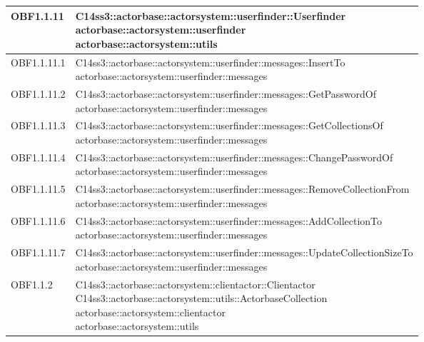 \documentclass{scalatekids-article}
\begin{document}
\begin{longtable}[H]{|p{4.5cm}|p{13cm}|}
\hline
OBF1.1.11 & \multiLineCell[t]{C14ss3::actorbase::actorsystem::userfinder::Userfinder\\actorbase::actorsystem::userfinder\\actorbase::actorsystem::utils\\}\\
\hline
OBF1.1.11.1 & \multiLineCell[t]{C14ss3::actorbase::actorsystem::userfinder::messages::InsertTo\\actorbase::actorsystem::userfinder::messages\\}\\
\hline
OBF1.1.11.2 & \multiLineCell[t]{C14ss3::actorbase::actorsystem::userfinder::messages::GetPasswordOf\\actorbase::actorsystem::userfinder::messages\\}\\
\hline
OBF1.1.11.3 & \multiLineCell[t]{C14ss3::actorbase::actorsystem::userfinder::messages::GetCollectionsOf\\actorbase::actorsystem::userfinder::messages\\}\\
\hline
OBF1.1.11.4 & \multiLineCell[t]{C14ss3::actorbase::actorsystem::userfinder::messages::ChangePasswordOf\\actorbase::actorsystem::userfinder::messages\\}\\
\hline
OBF1.1.11.5 & \multiLineCell[t]{C14ss3::actorbase::actorsystem::userfinder::messages::RemoveCollectionFrom\\actorbase::actorsystem::userfinder::messages\\}\\
\hline
OBF1.1.11.6 & \multiLineCell[t]{C14ss3::actorbase::actorsystem::userfinder::messages::AddCollectionTo\\actorbase::actorsystem::userfinder::messages\\}\\
\hline
OBF1.1.11.7 & \multiLineCell[t]{C14ss3::actorbase::actorsystem::userfinder::messages::UpdateCollectionSizeTo\\actorbase::actorsystem::userfinder::messages\\}\\
\hline
OBF1.1.2 & \multiLineCell[t]{C14ss3::actorbase::actorsystem::clientactor::Clientactor\\C14ss3::actorbase::actorsystem::utils::ActorbaseCollection\\actorbase::actorsystem::clientactor\\actorbase::actorsystem::utils\\}\\

\end{longtable}
\end{document}

